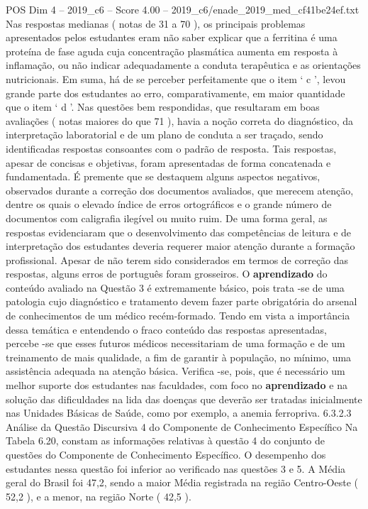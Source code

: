 \begin{textsample}{POS Dim 4 – 2019\_c6 – Score 4.00 – 2019\_c6/enade\_2019\_med\_cf41be24ef.txt}
Nas respostas medianas ( notas de 31 a 70 ), os principais problemas apresentados pelos estudantes eram não saber explicar que a ferritina é uma proteína de fase aguda cuja concentração plasmática aumenta em resposta à inflamação, ou não indicar adequadamente a conduta terapêutica e as orientações nutricionais.
Em suma, há de se perceber perfeitamente que o item ‘ c ’, levou grande parte dos estudantes ao erro, comparativamente, em maior quantidade que o item ‘ d ’.
Nas questões bem respondidas, que resultaram em boas avaliações ( notas maiores do que 71 ), havia a noção correta do diagnóstico, da interpretação laboratorial e de um plano de conduta a ser traçado, sendo identificadas respostas consoantes com o padrão de resposta.
Tais respostas, apesar de concisas e objetivas, foram apresentadas de forma concatenada e fundamentada.
É premente que se destaquem alguns aspectos negativos, observados durante a correção dos documentos avaliados, que merecem atenção, dentre os quais o elevado índice de erros ortográficos e o grande número de documentos com caligrafia ilegível ou muito ruim.
De uma forma geral, as respostas evidenciaram que o desenvolvimento das competências de leitura e de interpretação dos estudantes deveria requerer maior atenção durante a formação profissional.
Apesar de não terem sido considerados em termos de correção das respostas, alguns erros de português foram grosseiros.
O \textbf{aprendizado} do conteúdo avaliado na Questão 3 é extremamente básico, pois trata -se de uma patologia cujo diagnóstico e tratamento devem fazer parte obrigatória do arsenal de conhecimentos de um médico recém-formado.
Tendo em vista a importância dessa temática e entendendo o fraco conteúdo das respostas apresentadas, percebe -se que esses futuros médicos necessitariam de uma formação e de um treinamento de mais qualidade, a fim de garantir à população, no mínimo, uma assistência adequada na atenção básica.
Verifica -se, pois, que é necessário um melhor suporte dos estudantes nas faculdades, com foco no \textbf{aprendizado} e na solução das dificuldades na lida das doenças que deverão ser tratadas inicialmente nas Unidades Básicas de Saúde, como por exemplo, a anemia ferropriva. 6.3.2.3 Análise da Questão Discursiva 4 do Componente de Conhecimento Específico Na Tabela 6.20, constam as informações relativas à questão 4 do conjunto de questões do Componente de Conhecimento Específico.
O desempenho dos estudantes nessa questão foi inferior ao verificado nas questões 3 e 5.
A Média geral do Brasil foi 47,2, sendo a maior Média registrada na região Centro-Oeste ( 52,2 ), e a menor, na região Norte ( 42,5 ).

\end{textsample}
